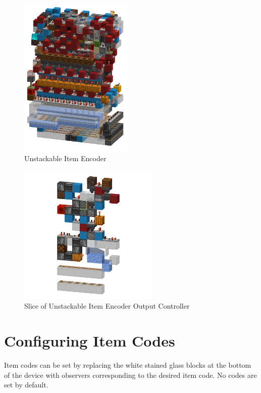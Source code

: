 \documentclass[10pt]{datasheet}
\begin{document}
\begin{figure}[H]
    \centering
    \includegraphics[width=0.48\textwidth]{area_render_33_.png}
    \caption{\centering Unstackable Item Encoder}
\end{figure}

\onecolumn

\begin{figure}[H]
    \centering
    \includegraphics[width=0.6\textwidth]{slice.png}
    \caption{\centering Slice of Unstackable Item Encoder Output Controller}
\end{figure}

\section{Configuring Item Codes}
Item codes can be set by replacing the white stained glass blocks at the bottom of the device with observers corresponding to the desired item code. No codes are set by default.
\end{document}
